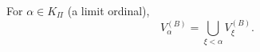 For $\alpha \in K_{\Pi}$ (a limit ordinal),
$$V_{\alpha}^{(B)} = \bigcup_{\xi < \alpha} V_{\xi}^{(B)}.$$
